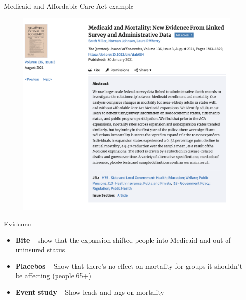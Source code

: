 \documentclass{beamer}
\begin{document}
\begin{frame}{Medicaid and Affordable Care Act example}

\begin{figure}
\includegraphics[scale=0.25]{./lecture_includes/medicaid_qje}
\end{figure}

\end{frame}

\begin{frame}{Evidence}

\begin{itemize}
\item \textbf{Bite} -- show that the expansion shifted people into Medicaid and out of uninsured status
\item \textbf{Placebos} -- Show that there's no effect on mortality for groups it shouldn't be affecting (people 65+)
\item \textbf{Event study} -- Show leads and lags on mortality
\end{itemize}

\end{frame}




\end{document}
